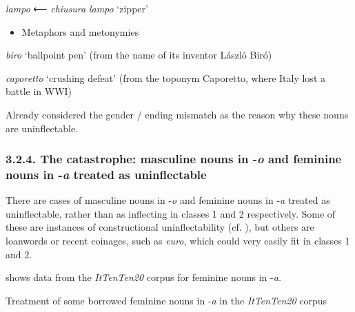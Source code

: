 \documentclass[output=paper]{langscibook}
\begin{document}
\begin{styleListParagraph}
\textit{lampo} ⟵ \textit{chiusura} \textit{lampo} ‘zipper’
\end{styleListParagraph}

\begin{itemize}
\item \begin{styleListParagraph}
Metaphors and metonymies
\end{styleListParagraph}
\end{itemize}
\begin{styleListParagraph}
\textit{biro} ‘ballpoint pen’ (from the name of its inventor László Biró)
\end{styleListParagraph}

\begin{styleListParagraph}
\textit{caporetto} ‘crushing defeat’ (from the toponym Caporetto, where Italy lost a battle in WWI)
\end{styleListParagraph}

Already \citet[106]{Migliorini1957} considered the gender / ending mismatch as the reason why these nouns are uninflectable.

\subsubsection{3.2.4. The catastrophe: masculine nouns in \nobreakdash-\textit{o} and feminine nouns in \nobreakdash-\textit{a} treated as uninflectable}

There are cases of masculine nouns in \nobreakdash-\textit{o} and feminine nouns in \nobreakdash-\textit{a} treated as uninflectable, rather than as inflecting in classes 1 and 2 respectively. Some of these are instances of constructional uninflectability (cf. ), but others are loanwords or recent coinages, such as \textit{euro}, which could very easily fit in classes 1 and 2.

 shows data from the \textit{ItTenTen20} corpus for feminine nouns in \nobreakdash-\textit{a.}

\begin{stylelsTable}
 Treatment of some borrowed feminine nouns in \nobreakdash-\textit{a} in the \textit{ItTenTen20} corpus
\end{stylelsTable}
\end{document}
